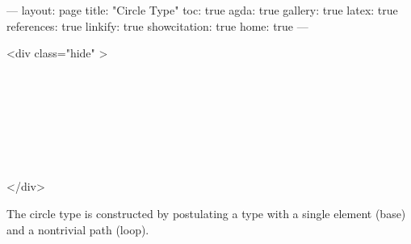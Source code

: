 ---
layout: page
title: "Circle Type"
toc: true
agda: true
gallery: true
latex: true
references: true
linkify: true
showcitation: true
home: true
---

<div class="hide" >
\begin{code}%
\>[0]\AgdaSymbol{\{-\#}\AgdaSpace{}%
\AgdaSpace{}%
\AgdaSpace{}%
\AgdaSymbol{\#-\}}\<%
\\
\>[0]\AgdaSpace{}%
\AgdaSpace{}%
\<%
\\
\>[0]\AgdaSpace{}%
\AgdaSpace{}%
\<%
\\
%
\\[\AgdaEmptyExtraSkip]%
\>[0]\AgdaSpace{}%
\AgdaSpace{}%
\<%
\\
\>[0]\AgdaSpace{}%
\AgdaSpace{}%
\<%
\\
\>[0]\AgdaSpace{}%
\AgdaSpace{}%
\<%
\end{code}
</div>

The circle type is constructed by postulating a type with
a single element (base) and a nontrivial path (loop).

